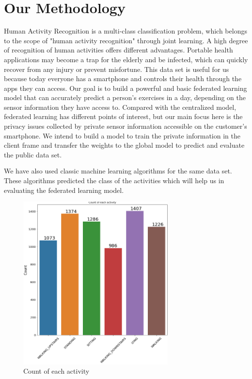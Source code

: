 \documentclass[12pt,conference]{IEEEtran}
\begin{document}
\section{
\textbf{Our Methodology}\label{sec:sys}
}

Human Activity Recognition is a multi-class classification problem, which belongs to the scope of "human activity recognition" through joint learning. A high degree of recognition of human activities offers different advantages. Portable health applications may become a trap for the elderly and be infected, which can quickly recover from any injury or prevent misfortune. This data set is useful for us because today everyone has a smartphone and controls their health through the apps they can access. Our goal is to build a powerful and basic federated learning model that can accurately predict a person’s exercises in a day, depending on the sensor information they have access to. Compared with the centralized model, federated learning has different points of interest, but our main focus here is the privacy issues collected by private sensor information accessible on the customer's smartphone. We intend to build a model to train the private information in the client frame and transfer the weights to the global model to predict and evaluate the public data set.

We have also used classic machine learning algorithms for the same data set. These algorithms predicted the class of the activities which will help us in evaluating the federated learning model.




\begin{figure} [!t]
	\centering
\includegraphics[width=3.1in]{EDA.PNG}
	\caption{Count of each activity}
	\label{Number of each activity}
\end{figure}
\end{document}
